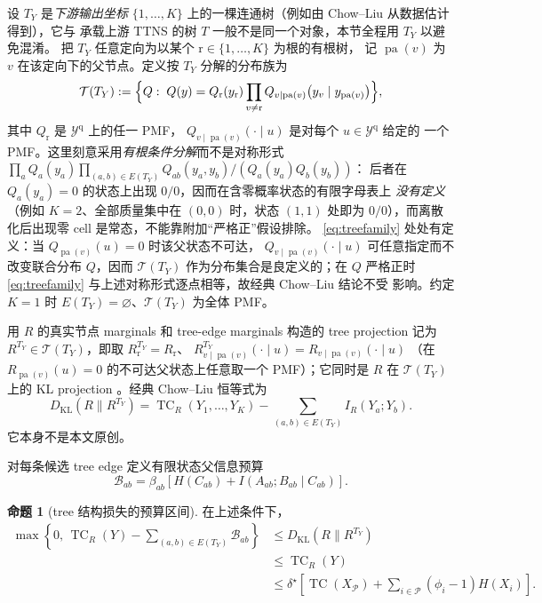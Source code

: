 \documentclass[a4paper,11pt]{article}
\theoremstyle{definition}
\newtheorem{proposition}{命题}
\newcommand{\1}{\mathbf 1}
\newcommand{\KL}{\mathrm{KL}}
\newcommand{\pa}{\operatorname{pa}}
\newcommand{\TC}{\operatorname{TC}}
\newcommand{\calT}{\mathcal T}
\newcommand{\Pset}{\mathcal P}
\begin{document}
设 $T_Y$ 是\emph{下游输出坐标}
$\{1,\ldots,K\}$ 上的一棵连通树（例如由 Chow--Liu 从数据估计得到），它与
承载上游 TTNS 的树 $T$ 一般不是同一个对象，本节全程用 $T_Y$ 以避免混淆。
把 $T_Y$ 任意定向为以某个 $\mathrm{r}\in\{1,\ldots,K\}$ 为根的有根树，
记 $\pa(v)$ 为 $v$ 在该定向下的父节点。定义按 $T_Y$ 分解的分布族为
\begin{equation}
\label{eq:treefamily}
\calT(T_Y)
:=
\Bigl\{
Q:\;
Q(y)=Q_{\mathrm r}(y_{\mathrm r})
\prod_{v\ne \mathrm r}
Q_{v\mid\pa(v)}\bigl(y_v\mid y_{\pa(v)}\bigr)
\Bigr\},
\end{equation}
其中 $Q_{\mathrm r}$ 是 $\mathcal Y^{\mathrm{q}}$ 上的任一 PMF，
$Q_{v\mid\pa(v)}(\cdot\mid u)$ 是对每个 $u\in\mathcal Y^{\mathrm{q}}$ 给定的
一个 PMF。这里刻意采用\emph{有根条件分解}而不是对称形式
$\prod_aQ_a(y_a)\prod_{(a,b)\in E(T_Y)}Q_{ab}(y_a,y_b)/(Q_a(y_a)Q_b(y_b))$：
后者在 $Q_a(y_a)=0$ 的状态上出现 $0/0$，因而在含零概率状态的有限字母表上
\emph{没有定义}（例如 $K=2$、全部质量集中在 $(0,0)$ 时，状态 $(1,1)$ 处即为
$0/0$），而离散化后出现零 cell 是常态，不能靠附加“严格正”假设排除。
\eqref{eq:treefamily} 处处有定义：当 $Q_{\pa(v)}(u)=0$ 时该父状态不可达，
$Q_{v\mid\pa(v)}(\cdot\mid u)$ 可任意指定而不改变联合分布 $Q$，因而
$\calT(T_Y)$ 作为分布集合是良定义的；在 $Q$ 严格正时
\eqref{eq:treefamily} 与上述对称形式逐点相等，故经典 Chow--Liu 结论不受
影响。约定 $K=1$ 时 $E(T_Y)=\varnothing$、$\calT(T_Y)$ 为全体 PMF。

用 $R$ 的真实节点
marginals 和 tree-edge marginals 构造的 tree projection 记为
$R^{T_Y}\in\calT(T_Y)$，即取
$R^{T_Y}_{\mathrm r}=R_{\mathrm r}$、
$R^{T_Y}_{v\mid\pa(v)}(\cdot\mid u)=R_{v\mid\pa(v)}(\cdot\mid u)$
（在 $R_{\pa(v)}(u)=0$ 的不可达父状态上任意取一个 PMF）；它同时是 $R$ 在
$\calT(T_Y)$ 上的 KL projection
\cite{ChowLiu1968}。经典 Chow--Liu 恒等式为 \cite{ChowLiu1968}
\[
D_{\KL}(R\|R^{T_Y})
=
\TC_R(Y_1,\ldots,Y_K)
-
\sum_{(a,b)\in E(T_Y)}I_R(Y_a;Y_b).
\]
它本身不是本文原创。

对每条候选 tree edge 定义有限状态父信息预算
\[
\mathcal B_{ab}
=
\beta_{ab}
\left[
H(C_{ab})
+
I(A_{ab};B_{ab}\mid C_{ab})
\right].
\]

\begin{proposition}[tree 结构损失的预算区间]
\label{prop:treebudget}
在上述条件下，
\[
\begin{aligned}
\max\left\{
0,\,
\TC_R(Y)-\sum_{(a,b)\in E(T_Y)}\mathcal B_{ab}
\right\}
&\le
D_{\KL}(R\|R^{T_Y})\\
&\le
\TC_R(Y)\\
&\le
\delta^\star
\left[
\TC(X_{\Pset})+\sum_{i\in\Pset}(\phi_i-1)H(X_i)
\right].
\end{aligned}
\]
\end{proposition}
\end{document}
